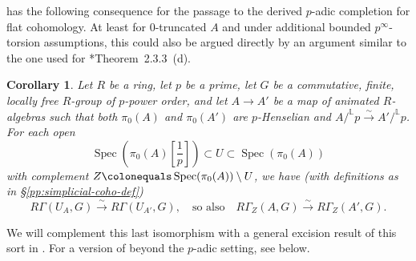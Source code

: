\documentclass[11pt, reqno]{amsart}
\newcommand{\bL}{\mathbb{L}}
\DeclareMathOperator{\Spec}{Spec}		%
\newcommand{\ce}{\colonequals}
\newcommand{\eps}{\epsilon}
\newcommand{\isomto}{\overset{\sim}{\longrightarrow}}
\newcommand{\ra}{\rightarrow}
\providecommand{\up}[1]{{\upshape(}#1{\upshape)}}
\providecommand{\uref}[1]{{\upshape\ref{#1}}}
\providecommand{\uS}{{\upshape\S}}
\providecommand{\f}[2]{\frac{#1}{#2}}
\providecommand{\qxq}[1]{\quad\text{#1}\quad}
\newcommand{\tst}{\textstyle}
\newcommand{\bpf}{\begin{proof}}
\newcommand{\epf}{\end{proof}}
\newcommand{\bcor}{\begin{cor}}
\newcommand{\ecor}{\end{cor}}
\numberwithin{equation}{numberingbase}
\theoremstyle{thms}
\newtheorem{cor}[numberingbase]{Corollary}
\theoremstyle{claims}
\theoremstyle{defs}
\theoremstyle{thms}
\theoremstyle{defs}
\theoremstyle{subsection-tweak}
\theoremstyle{subsection-tweak}
\begin{document}


%





 has the following consequence for the passage to the derived $p$-adic completion  for flat cohomology. At least for $0$-truncated $A$ and under additional bounded $p^\infty$-torsion assumptions, this could also be argued directly by an argument similar to the one used for \cite{BC19}*{Theorem~2.3.3~(d)}.


\bcor \label{heavy-handed}
Let $R$ be a ring, let $p$ be a prime, let $G$ be a commutative, finite, locally free $R$-group of $p$-power order, and let $A \ra A'$ be a map of animated $R$-algebras such that both $\pi_0(A)$ and $\pi_0(A')$ are $p$-Henselian and $A/^\bL p\isomto A'/^\bL p$. For each open 
\[
\tst \Spec(\pi_0(A)[\f{1}{p}]) \subset U \subset \Spec(\pi_0(A))
\]
with complement $Z \ce \Spec(\pi_0(A)) \setminus U$, we have \up{with definitions as in \uS\uref{pp:simplicial-coho-def}}
\[
\tst R\Gamma(U_A, G) \isomto R\Gamma(U_{A'}, G), \qxq{so also} R\Gamma_Z(A, G) \isomto R\Gamma_Z(A', G).
\]
\ecor

We will complement this last isomorphism with a general excision result of this sort in . For a version of  beyond the $p$-adic setting, see  below.
\end{document}
